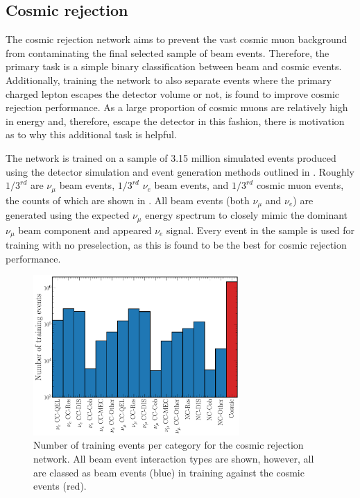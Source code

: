 \subsection{Cosmic rejection} %
\label{sec:cnn_specific_cosmic} %

The cosmic rejection network aims to prevent the vast cosmic muon background from contaminating
the final selected sample of beam events. Therefore, the primary task is a simple binary
classification between beam and cosmic events. Additionally, training the network to also separate
events where the primary charged lepton escapes the detector volume or not, is found to improve
cosmic rejection performance. As a large proportion of cosmic muons are relatively high in energy
and, therefore, escape the detector in this fashion, there is motivation as to why this additional
task is helpful.

The network is trained on a sample of 3.15 million simulated events produced using the detector
simulation and event generation methods outlined in . Roughly
$1/3^{rd}$ are $\nu_{\mu}$ beam events, $1/3^{rd}$ $\nu_{e}$ beam events, and $1/3^{rd}$ cosmic
muon events, the counts of which are shown in . All beam
events (both $\nu_{\mu}$ and $\nu_{e}$) are generated using the expected \chipsfive $\nu_{\mu}$
energy spectrum to closely mimic the dominant $\nu_{\mu}$ beam component and appeared $\nu_{e}$
signal. Every event in the sample is used for training with no preselection, as this is found to
be the best for cosmic rejection performance.

\begin{figure} %
    \includegraphics[width=0.7\textwidth]{diagrams/7-results/explore_cosmic_training_sample.pdf}
    \caption[Number of training events per category for the cosmic rejection network]
    {Number of training events per category for the cosmic rejection network. All beam event
        interaction types are shown, however, all are classed as beam events (blue) in training
        against the cosmic events (red).}
    \label{fig:cosmic_training_sample}
\end{figure}

